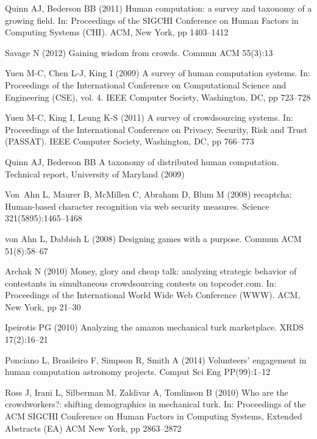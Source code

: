 \documentclass[11pt]{bmc_article_s50}
\begin{document}
\begin{thebibliography}{000}


Quinn AJ,
Bederson BB (2011)
{{Human computation: a survey and taxonomy of a growing field}}.
In: {Proceedings of the SIGCHI Conference on Human Factors in Computing
  Systems (CHI)}.
{ACM},
{New York}, pp 1403--{1412}


Savage N (2012)
{{Gaining wisdom from crowds}}.
{Commun ACM}
{55}(3):13


Yuen M-C,
Chen L-J,
King I (2009)
{A survey of human computation systems}.
In: {Proceedings of the International Conference on Computational
  Science and Engineering (CSE)},
vol. {4}.
{IEEE Computer Society},
{Washington, DC},
pp 723--{728}


Yuen M-C,
King I,
Leung K-S (2011)
{A survey of crowdsourcing systems}.
In: {Proceedings of the International Conference on Privacy, Security,
  Risk and Trust (PASSAT)}.
{IEEE Computer Society},
{Washington, DC},
pp 766--{773}

Quinn AJ,
Bederson BB
{A taxonomy of distributed human computation}.
Technical report,
University of Maryland
(2009)

Von~Ahn L,
Maurer B,
McMillen C,
Abraham D,
Blum M (2008)
{recaptcha: Human-based character recognition via web security
  measures}.
{Science}
{321}(5895):1465--{1468}



von Ahn L,
Dabbish L (2008)
{Designing games with a purpose}.
{Commun ACM}
{51}(8):58--{67}



Archak N (2010)
{Money, glory and cheap talk: analyzing strategic behavior of
  contestants in simultaneous crowdsourcing contests on topcoder.com}.
In: {Proceedings of the International World Wide Web Conference (WWW)}.
{ACM},
{New York},
pp 21--{30}


Ipeirotis PG (2010)
{Analyzing the amazon mechanical turk marketplace}.
{XRDS}
{17}(2):16--{21}



Ponciano L,
Brasileiro F,
Simpson R,
Smith A (2014)
{Volunteers' engagement in human computation astronomy projects.}
{Comput Sci Eng}
{PP}(99):1--12


Ross J,
Irani L,
Silberman M,
Zaldivar A,
Tomlinson B (2010)
{Who are the crowdworkers?: shifting demographics in mechanical turk}.
In: {Proceedings of the ACM SIGCHI Conference on Human Factors in Computing Systems, Extended
Abstracts (EA)}
{ACM}
{New York},
pp 2863--{2872}



\end{thebibliography}
\end{document}
